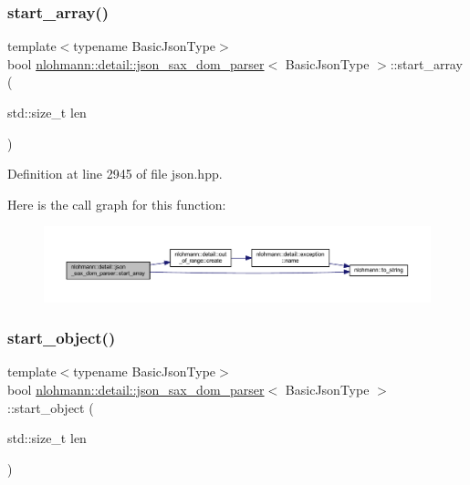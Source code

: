 \subsubsection{\texorpdfstring{start\_array()}{start\_array()}}
{\footnotesize\ttfamily template$<$typename Basic\+Json\+Type$>$ \\
bool \mbox{\hyperlink{classnlohmann_1_1detail_1_1json__sax__dom__parser}{nlohmann\+::detail\+::json\+\_\+sax\+\_\+dom\+\_\+parser}}$<$ Basic\+Json\+Type $>$\+::start\+\_\+array (\begin{DoxyParamCaption}\item[{std\+::size\+\_\+t}]{len }\end{DoxyParamCaption})\hspace{0.3cm}{\ttfamily [inline]}}



Definition at line 2945 of file json.\+hpp.

Here is the call graph for this function\+:
\nopagebreak
\begin{figure}[H]
\begin{center}
\leavevmode
\includegraphics[width=350pt]{classnlohmann_1_1detail_1_1json__sax__dom__parser_a056b895d011efaf48ea096c024aca0d4_cgraph}
\end{center}
\end{figure}
\mbox{\label{classnlohmann_1_1detail_1_1json__sax__dom__parser_a9929b4cc92d471c49bd0a92802629f90}} 
\subsubsection{\texorpdfstring{start\_object()}{start\_object()}}
{\footnotesize\ttfamily template$<$typename Basic\+Json\+Type$>$ \\
bool \mbox{\hyperlink{classnlohmann_1_1detail_1_1json__sax__dom__parser}{nlohmann\+::detail\+::json\+\_\+sax\+\_\+dom\+\_\+parser}}$<$ Basic\+Json\+Type $>$\+::start\+\_\+object (\begin{DoxyParamCaption}\item[{std\+::size\+\_\+t}]{len }\end{DoxyParamCaption})\hspace{0.3cm}{\ttfamily [inline]}}



